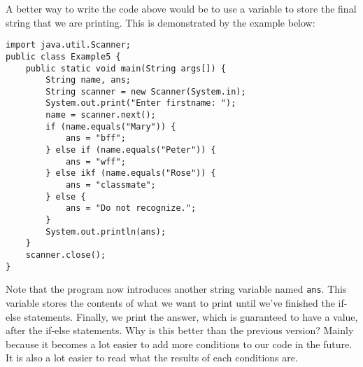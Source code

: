 A better way to write the code above would be to use a variable to store the final string that we are printing. This is demonstrated by the example below:

\begin{lstlisting}
import java.util.Scanner;
public class Example5 {
    public static void main(String args[]) {
        String name, ans;
        String scanner = new Scanner(System.in);
        System.out.print("Enter firstname: ");
        name = scanner.next();
        if (name.equals("Mary")) {
            ans = "bff";
        } else if (name.equals("Peter")) {
            ans = "wff";
        } else ikf (name.equals("Rose")) {
            ans = "classmate";
        } else {
            ans = "Do not recognize.";
        }
        System.out.println(ans);
    }
    scanner.close();
}
\end{lstlisting}

Note that the program now introduces another string variable named \verb!ans!. This variable stores the contents of what we want to print until we've finished the if-else statements. Finally, we print the answer, which is guaranteed to have a value, after the if-else statements. Why is this better than the previous version? Mainly because it becomes a lot easier to add more conditions to our code in the future. It is also a lot easier to read what the results of each conditions are. 